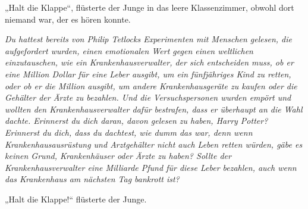 „Halt die Klappe“, flüsterte der Junge in das leere Klassenzimmer, obwohl dort niemand war, der es hören konnte.

\emph{Du hattest bereits von Philip Tetlocks Experimenten mit Menschen gelesen, die aufgefordert wurden, einen emotionalen Wert gegen einen weltlichen einzutauschen, wie ein Krankenhausverwalter, der sich entscheiden muss, ob er eine Million Dollar für eine Leber ausgibt, um ein fünfjähriges Kind zu retten, oder ob er die Million ausgibt, um andere Krankenhausgeräte zu kaufen oder die Gehälter der Ärzte zu bezahlen. Und die Versuchspersonen wurden empört und wollten den Krankenhausverwalter dafür bestrafen, dass er überhaupt an die Wahl dachte. Erinnerst du dich daran, davon gelesen zu haben, Harry Potter? Erinnerst du dich, dass du dachtest, wie dumm das war, denn wenn Krankenhausausrüstung und Arztgehälter nicht auch Leben retten würden, gäbe es keinen Grund, Krankenhäuser oder Ärzte zu haben? Sollte der Krankenhausverwalter eine Milliarde Pfund für diese Leber bezahlen, auch wenn das Krankenhaus am nächsten Tag bankrott ist?}

„Halt die Klappe!“ flüsterte der Junge.

